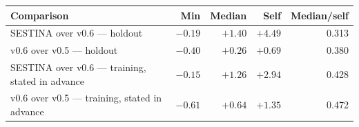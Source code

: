 \begin{tabular}{lrrrr}
\toprule
Comparison & Min & Median & Self & Median/self \\
\midrule
SESTINA over v0.6 --- holdout & $-0.19$ & $+1.40$ & $+4.49$ & 0.313 \\
v0.6 over v0.5 --- holdout & $-0.40$ & $+0.26$ & $+0.69$ & 0.380 \\
SESTINA over v0.6 --- training, stated in advance & $-0.15$ & $+1.26$ & $+2.94$ & 0.428 \\
v0.6 over v0.5 --- training, stated in advance & $-0.61$ & $+0.64$ & $+1.35$ & 0.472 \\
\bottomrule
\end{tabular}
